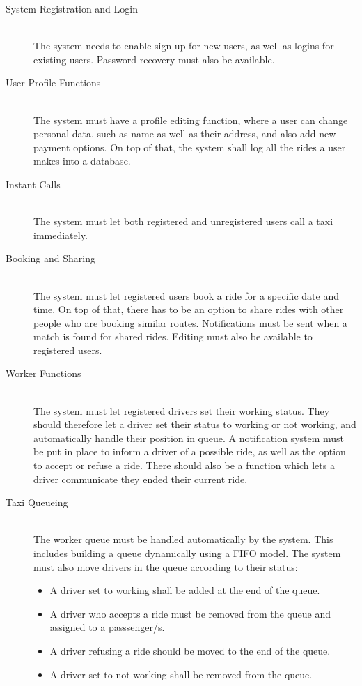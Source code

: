 \begin{description}

        \item[System Registration and Login] \hfill \\
		The system needs to enable sign up for new users, as well as logins for existing users. Password recovery must also be available.
        \item[User Profile Functions] \hfill \\
		The system must have a profile editing function, where a user can change personal data, such as name as well as their address,
		and also add new payment options. On top of that, the system shall log all the rides a user makes into a database.
		\item[Instant Calls] \hfill \\
		The system must let both registered and unregistered users call a taxi immediately.
		\item[Booking and Sharing] \hfill \\
		The system must let registered users book a ride for a specific date and time. On top of that, there has to be an option to share
		rides with other people who are booking similar routes. Notifications must be sent when a match is found for shared rides. Editing must
		also be available to registered users.
		\item[Worker Functions] \hfill \\
		The system must let registered drivers set their working status. They should therefore let a driver set their status to working or not
		working, and automatically handle their position in queue. A notification system must be put in place to inform a driver of a possible
		ride, as well as the option to accept or refuse a ride.	There should also be a function which lets a driver communicate they ended their
		current ride.
		\item[Taxi Queueing] \hfill \\
		The worker queue must be handled automatically by the system. This includes building a queue dynamically using a FIFO model. The system
		must also move drivers in the queue according to their status:
			\begin{itemize}
				\item A driver set to working shall be added at the end of the queue.
				\item A driver who accepts a ride must be removed from the queue and assigned to a passsenger/s.
				\item A driver refusing a ride should be moved to the end of the queue.
				\item A driver set to not working shall be removed from the queue.
			\end{itemize}
\end{description}
\newpage
